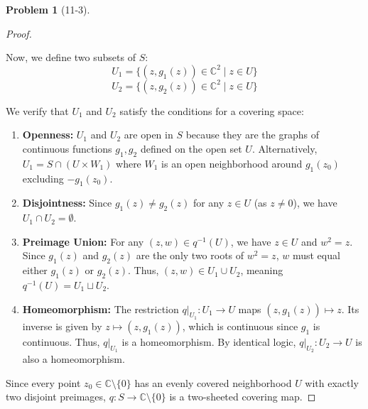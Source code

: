 \documentclass[11pt, a4paper]{article}
\theoremstyle{definition}
\newtheorem{prob}{Problem}
\newenvironment{problem}[1][]{\begin{prob}[#1]\normalfont}{\end{prob}\vspace{1.5em}}
\begin{document}
\begin{problem}[11-3]
\begin{proof}
\begin{itemize}
    Now, we define two subsets of $S$:
    $$ U_1 = \{ (z, g_1(z)) \in \mathbb{C}^2 \mid z \in U \} $$
    $$ U_2 = \{ (z, g_2(z)) \in \mathbb{C}^2 \mid z \in U \} $$
    
    We verify that $U_1$ and $U_2$ satisfy the conditions for a covering space:
    \begin{enumerate}
        \item \textbf{Openness:} $U_1$ and $U_2$ are open in $S$ because they are the graphs of continuous functions 
        $g_1, g_2$ defined on the open set $U$. Alternatively, $U_1 = S \cap (U \times W_1)$ where $W_1$ is an open 
        neighborhood around $g_1(z_0)$ excluding $-g_1(z_0)$.
        \item \textbf{Disjointness:} Since $g_1(z) \neq g_2(z)$ for any $z \in U$ (as $z \neq 0$), we have 
        $U_1 \cap U_2 = \emptyset$.
        \item \textbf{Preimage Union:} For any $(z, w) \in q^{-1}(U)$, we have $z \in U$ and $w^2 = z$. Since 
        $g_1(z)$ and $g_2(z)$ are the only two roots of $w^2 = z$, $w$ must equal either $g_1(z)$ or $g_2(z)$. 
        Thus, $(z,w) \in U_1 \cup U_2$, meaning $q^{-1}(U) = U_1 \sqcup U_2$.
        \item \textbf{Homeomorphism:} The restriction $q|_{U_1}: U_1 \to U$ maps $(z, g_1(z)) \mapsto z$. Its 
        inverse is given by $z \mapsto (z, g_1(z))$, which is continuous since $g_1$ is continuous. Thus, 
        $q|_{U_1}$ is a homeomorphism. By identical logic, $q|_{U_2}: U_2 \to U$ is also a homeomorphism.
    \end{enumerate}
\end{itemize}
Since every point $z_0 \in \mathbb{C} \setminus \{0\}$ has an evenly covered neighborhood $U$ with exactly two 
disjoint preimages, $q: S \to \mathbb{C} \setminus \{0\}$ is a two-sheeted covering map.
\end{proof}
\end{problem}
\end{document}
